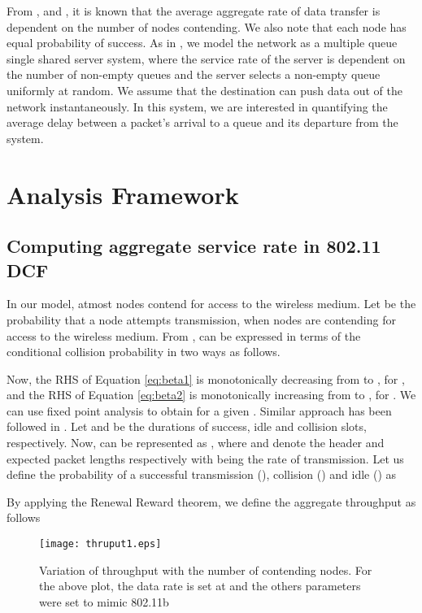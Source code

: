 \documentclass[10pt, conference, compsocconf]{IEEEtran}
\begin{document}
From \cite{bianchi}, \cite{tay} and \cite{akumar}, it is known that the average aggregate rate of data transfer is dependent on the number of nodes contending. We also note that each node has equal probability of success. As in \cite{tobagi}, we model the network as a multiple queue single shared server system, where the service rate of the server is dependent on the number of non-empty queues and the server selects a non-empty queue uniformly at random. We assume that the destination can push data out of the network instantaneously. In this system, we are interested in quantifying the average delay between a packet's arrival to a queue and its departure from the system. 

\section{\large{Analysis Framework}}
\label{analysis}

\subsection{Computing aggregate service rate in 802.11 DCF}
\label{bia}
In our model, atmost  nodes contend for access to the wireless medium. Let  be the probability that a node attempts transmission, when  nodes are contending for access to the wireless medium. From \cite{bianchi},  can be expressed in terms of the conditional collision probability  in two ways as follows.




Now, the RHS of Equation \eqref{eq:beta1} is monotonically decreasing from  to , for , and the RHS of Equation \eqref{eq:beta2} is monotonically increasing from  to , for . We can use fixed point analysis to obtain  for a given . Similar approach has been followed in \cite{akumar}. Let  and  be the durations of success, idle and collision slots, respectively. Now,  can be represented as , where  and  denote the header and expected packet lengths respectively with  being the rate of transmission. Let us define the probability of a successful transmission (), collision () and idle () as

	
By applying the Renewal Reward theorem, we define the aggregate throughput as follows

\begin{figure}[h]
\centering
\texttt{[image: thruput1.eps]}
\caption {Variation of throughput with the number of contending nodes. For the above plot, the data rate is set at  and the others parameters were set to mimic 802.11b}
\label{fig:thruput}
\end{figure}
\end{document}
